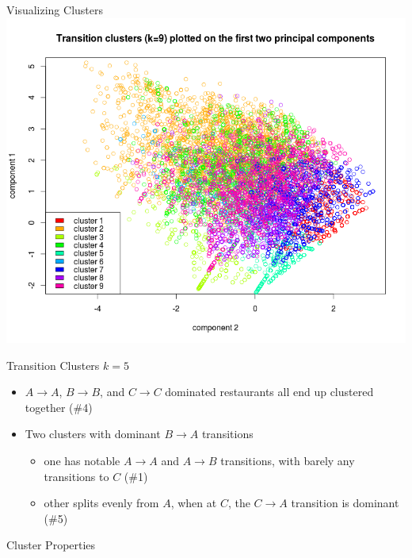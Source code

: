 \documentclass[12pt]{beamer}
\begin{document}
\begin{frame}{Visualizing Clusters}
\includegraphics[height=\textheight]{plots/trans_pca3}
\end{frame}

\begin{frame}{Transition Clusters}
\vfill
$k=5$
\begin{itemize}
	\item $A \rightarrow A$, $B \rightarrow B$, and $C \rightarrow C$ dominated
	restaurants all end up clustered together (\#4)
	\item Two clusters with dominant $B \rightarrow A$ transitions
	\begin{itemize}
		\item one has notable $A \rightarrow A$ and $A \rightarrow B$ transitions,
		with barely any transitions to $C$ (\#1)
		\item other splits evenly from $A$, when at $C$, the $C \rightarrow A$
		transition is dominant (\#5)
	\end{itemize}
\end{itemize}
\vfill
\end{frame}

\begin{frame}{Cluster Properties}

\end{frame}
\end{document}
